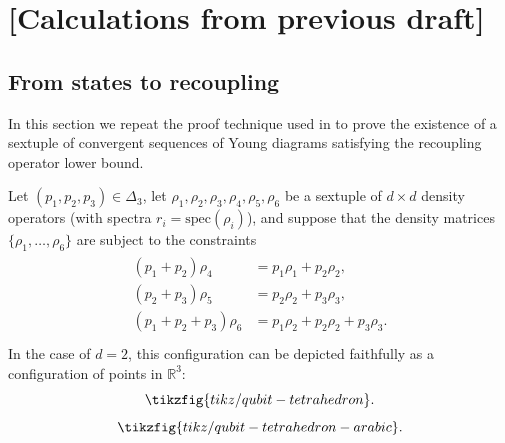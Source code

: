 \documentclass[notitlepage, 10pt]{article}
\begin{document}
\clearpage
\section{[Calculations from previous draft]}
\subsection{From states to recoupling}

In this section we repeat the proof technique used in \cite{christandl2008quantum} to prove the existence of a sextuple of convergent sequences of Young diagrams satisfying the recoupling operator lower bound.

Let $(p_1, p_2, p_3) \in \Delta_3$, let $\rho_{1}, \rho_{2}, \rho_{3}, \rho_{4}, \rho_{5}, \rho_{6}$ be a sextuple of $d\times d$ density operators (with spectra $r_i = \mathrm{spec}(\rho_{i})$), and suppose that the density matrices $\{\rho_1, \ldots, \rho_6\}$ are subject to the constraints
\begin{align}
    \label{eq:sextuple_config_constraints}
    \begin{split}
        (p_1+p_2)\rho_{4} &= p_1 \rho_1 + p_2 \rho_2, \\
        (p_2+p_3)\rho_{5} &= p_2 \rho_2 + p_3 \rho_3, \\
        (p_1+p_2+p_3)\rho_{6} &= p_1 \rho_2 + p_2 \rho_2 + p_3 \rho_3. \\
    \end{split}
\end{align}
In the case of $d=2$, this configuration can be depicted faithfully as a configuration of points in $\mathbb R^{3}$:
\begin{equation}
    \tikzfig{tikz/qubit-tetrahedron}.
\end{equation}
\begin{equation}
    \tikzfig{tikz/qubit-tetrahedron-arabic}.
\end{equation}
\end{document}
